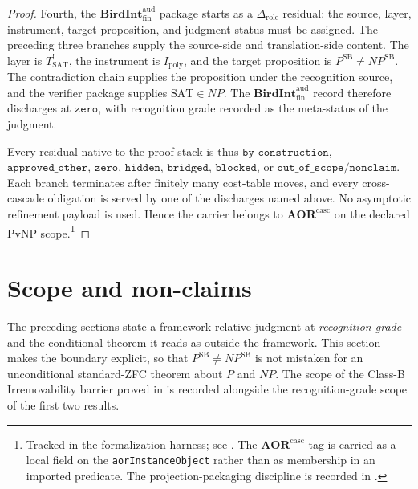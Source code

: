 \documentclass[11pt]{article}
\newcommand{\Tsat}{T^{!}_{\mathrm{SAT}}}
\newcommand{\Ipoly}{I_{\mathrm{poly}}}
\newcommand{\PSB}{P^{\mathrm{SB}}}
\newcommand{\NPSB}{NP^{\mathrm{SB}}}
\newcommand{\BirdInt}{\mathbf{BirdInt}^{\mathrm{aud}}_{\mathrm{fin}}}
\newcommand{\RecognitionGrade}{\emph{recognition grade}}
\theoremstyle{definition}
\begin{document}
\begin{proof}
Fourth, the \(\BirdInt\) package starts as a \(\Delta_{\mathrm{role}}\)
residual: the source, layer, instrument, target proposition, and
judgment status must be assigned.  The preceding three branches
supply the source-side and translation-side content.  The layer is
\(\Tsat\), the instrument is \(\Ipoly\), and the target proposition is
\(\PSB\neq\NPSB\).  The contradiction chain supplies the proposition
under the recognition source, and the verifier package supplies
\(\mathrm{SAT}\in NP\).  The \(\BirdInt\) record therefore discharges
at \(\texttt{zero}\), with recognition grade recorded as the
meta-status of the judgment.

Every residual native to the proof stack is thus
\(\texttt{by\_construction}\), \(\texttt{approved\_other}\),
\(\texttt{zero}\), \(\texttt{hidden}\), \(\texttt{bridged}\),
\(\texttt{blocked}\), or
\(\texttt{out\_of\_scope}/\texttt{nonclaim}\).  Each branch terminates
after finitely many cost-table moves, and every cross-cascade
obligation is served by one of the discharges named above.  No
asymptotic refinement payload is used.  Hence the carrier belongs to
\(\mathbf{AOR}^{\mathrm{casc}}\) on the declared PvNP scope.\footnote{Tracked
in the formalization harness; see .  The
\(\mathbf{AOR}^{\mathrm{casc}}\) tag is carried as a local field on the
\texttt{aorInstanceObject} rather than as membership in an imported
predicate.  The projection-packaging discipline is recorded in
.}
\end{proof}
 

\section{Scope and non-claims}
\label{sec:scope}

The preceding sections state a framework-relative judgment at
\RecognitionGrade{} and the conditional theorem it reads as outside the
framework.  This section makes the boundary explicit, so that
\(\PSB\neq\NPSB\) is not mistaken for an unconditional standard-ZFC
theorem about \(P\) and \(NP\).  The scope of the Class-B Irremovability
barrier proved in  is recorded alongside the
recognition-grade scope of the first two results.
\end{document}
